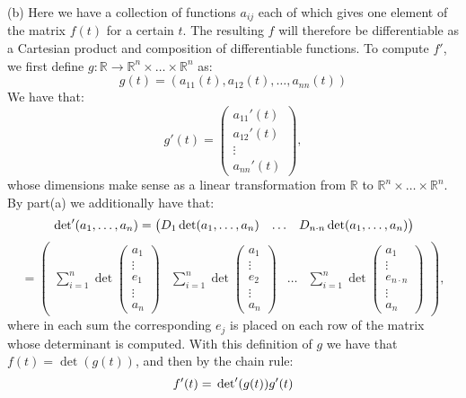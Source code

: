 (b) Here we have a collection of functions $a_{ij}$ each of which gives one element of the matrix $f(t)$ for a certain $t$.
The resulting $f$ will therefore be differentiable as a Cartesian product and composition of differentiable functions.
To compute $f'$, we first define $g: \mathbb{R} \rightarrow \mathbb{R}^n \times \ldots \times  \mathbb{R}^n$ as:
$$g(t) = (a_{11}(t), a_{12}(t), \ldots, a_{nn}(t))$$
We have that:
$$g'(t) = \begin{pmatrix}
    a_{11}'(t) \\
    a_{12}'(t) \\
    \vdots \\
    a_{nn}'(t)
\end{pmatrix},$$
whose dimensions make sense as a linear transformation from $\mathbb{R}$ to $\mathbb{R}^n \times \ldots \times \mathbb{R}^n$. 
By part(a) we additionally have that:
$$\sideset{}{'}\det(a_1, \ldots, a_n) = \begin{pmatrix}
    D_1 \det(a_1, \ldots, a_n) & \ldots & D_{n \cdot n} \det(a_1, \ldots, a_n)
\end{pmatrix}$$
$$ = \begin{pmatrix} \sum_{i=1}^{n} \det \begin{pmatrix}
    a_1 \\ \vdots \\ e_1 \\ \vdots \\ a_n
\end{pmatrix} & \sum_{i=1}^{n} \det \begin{pmatrix}
    a_1 \\ \vdots \\ e_2 \\ \vdots \\ a_n
\end{pmatrix} & \ldots & \sum_{i=1}^{n} \det \begin{pmatrix}
    a_1 \\ \vdots \\ e_{n \cdot n} \\ \vdots \\ a_n
\end{pmatrix} \end{pmatrix},$$
where in each sum the corresponding $e_j$ is placed on each row of the matrix whose determinant is computed.
With this definition of $g$ we have that $f(t) = \det(g(t))$, and then by the chain rule:
$$f'(t) = \sideset{}{'}\det(g(t))g'(t)$$
